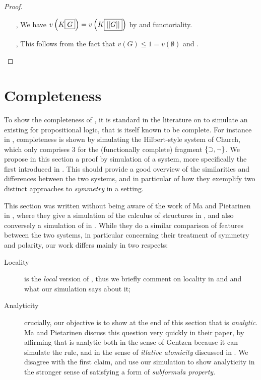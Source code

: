 \begin{scope}
\begin{proof}
\begin{itemize}
    \item[\kl{Dcut{\da}}, \kl{Dcut{\ua}}] We have
    $v\left(K\fbox{$G$}\right) = v\left(K\fbox{$[[G]]$}\right)$ by
     and functoriality.

    \item[\kl{Ins}, \kl{Del}] This follows from the fact that $v(G) \leq 1 =
    v(\emptyset)$ and .
  \end{itemize}
\end{proof}

\section{Completeness}

To show the completeness of , it is standard in the literature on 
to simulate an existing  for  propositional logic, that is
itself known to be complete. For instance in \cite{Roberts+1973}, completeness
is shown by simulating the Hilbert-style system  of Church, which only
comprises 3  for the (functionally complete) fragment $\{\supset, \neg\}$.
We propose in this section a proof by simulation of a \emph{}
system, more specifically the   first introduced
in . This should provide a good overview of the
similarities and differences between the two systems, and in particular of how
they exemplify two distinct approaches to \emph{symmetry} in a 
setting.

\begin{kaonote}
  This section was written without being aware of the work of Ma and Pietarinen
  in , where they give a simulation of the calculus of
  structures  in , and also conversely a simulation of
   in . While they do a similar comparison of features
  between the two systems, in particular concerning their treatment of symmetry
  and polarity, our work differs mainly in two respects:
  \begin{description}
    \item[Locality]  is the \emph{local} version of , thus we
    briefly comment on locality in  and  and what our
    simulation says about it;
    \item[Analyticity] crucially, our objective is to show at the end of this
    section that  is \emph{analytic}. Ma and Pietarinen discuss this
    question very quickly in their paper, by affirming that  is
    analytic both in the sense of Gentzen because it can simulate the 
    rule, and in the sense of \emph{illative atomicity} discussed in
    . We disagree with the first claim, and use our simulation
    to show analyticity in the stronger sense of satisfying a form of
    \emph{subformula property}.
  \end{description}
\end{kaonote}


\end{scope}

